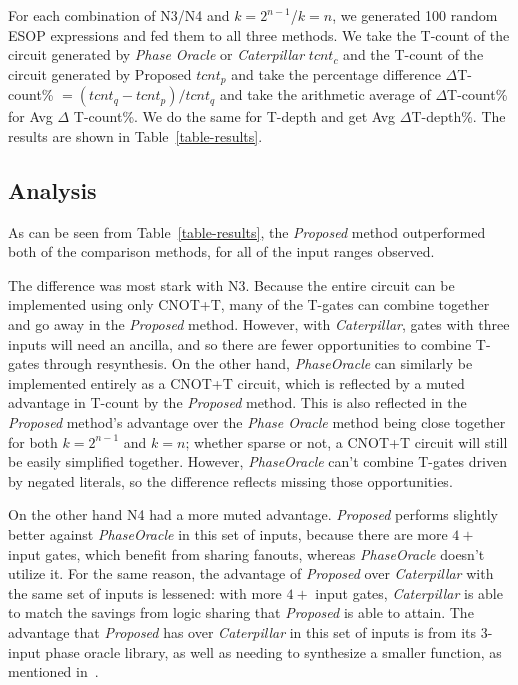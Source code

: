 For each combination of N3/N4 and $k=2^{n-1}$/$k=n$, we generated 100 random ESOP expressions and fed them
to all three methods. We take the T-count of the circuit generated by {\it Phase Oracle} or
{\it Caterpillar} $tcnt_c$ and the T-count of the circuit generated by Proposed $tcnt_p$ and take the
percentage difference $\Delta$T-count\% $= (tcnt_q - tcnt_p) / tcnt_q$ and take the arithmetic average of
$\Delta$T-count\% for Avg $\Delta$ T-count\%. We do the same for T-depth and get Avg $\Delta$T-depth\%.
The results are shown in Table~\ref{table-results}.

\begin{table}[t]
  \begin{center}
    \scalebox{1.0} {
      
    }
  \end{center}
  \caption{Experimental Results}
  \label{table-results}
\end{table}

\subsection{Analysis}

As can be seen from Table~\ref{table-results}, the {\it Proposed} method outperformed both of the
comparison methods, for all of the input ranges observed.

The difference was most stark with N3. Because the entire circuit can be implemented using only
CNOT+T, many of the T-gates can combine together and go away in the {\it Proposed} method. However,
with {\it Caterpillar}, gates with three inputs will need an ancilla, and so there are fewer opportunities
to combine T-gates through resynthesis. On the other hand, {\it PhaseOracle} can similarly be implemented
entirely as a CNOT+T circuit, which is reflected by a muted advantage in T-count by the {\it Proposed} method.
This is also reflected in the {\it Proposed} method's advantage over the {\it Phase Oracle} method being close
together for both $k=2^{n-1}$ and $k=n$; whether sparse or not, a CNOT+T circuit will still be easily simplified
together. However, {\it PhaseOracle} can't combine T-gates driven by negated literals, so the difference reflects
missing those opportunities.

On the other hand N4 had a more muted advantage. {\it Proposed} performs slightly better against {\it PhaseOracle}
in this set of inputs, because there are more $4+$ input gates, which benefit from sharing fanouts, whereas
{\it PhaseOracle} doesn't utilize it. For the same reason, the advantage of {\it Proposed} over {\it Caterpillar}
with the same set of inputs is lessened: with more $4+$ input gates, {\it Caterpillar} is able to match
the savings from logic sharing that {\it Proposed} is able to attain. The advantage that {\it Proposed} has over
{\it Caterpillar} in this set of inputs is from its 3-input phase oracle library, as well as needing to synthesize
a smaller function, as mentioned in~.

